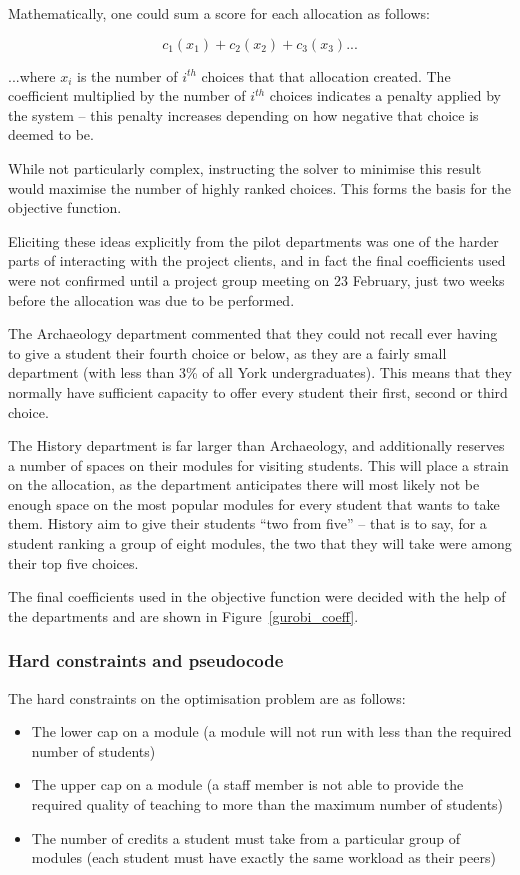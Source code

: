 Mathematically, one could sum a score for each allocation as follows:

$$
c_1(x_1) + c_2(x_2) + c_3(x_3) ...
$$

...where $x_i$ is the number of $i^{th}$ choices that that allocation created.
The coefficient multiplied by the number of $i^{th}$ choices indicates a
penalty applied by the system -- this penalty increases depending on how
negative that choice is deemed to be.

While not particularly complex, instructing the solver to minimise this result
would maximise the number of highly ranked choices. This forms the basis for
the objective function.

Eliciting these ideas explicitly from the pilot departments was one of the
harder parts of interacting with the project clients, and in fact the final
coefficients used were not confirmed until a project group meeting on 23
February, just two weeks before the allocation was due to be performed.

The Archaeology department commented that they could not recall ever having to
give a student their fourth choice or below, as they are a fairly small
department (with less than 3\% of all York %
undergraduates). This means that they normally have sufficient capacity to
offer every student their first, second or third choice.

The History department is far larger than Archaeology, and additionally
reserves a number of spaces on their modules for visiting students. This will
place a strain on the allocation, as the department anticipates there will
most likely not be enough space on the most popular modules for every student
that wants to take them. History aim to give their students ``two from five''
-- that is to say, for a student ranking a group of eight modules, the two
that they will take were among their top five choices.

The final coefficients used in the objective function were decided with the
help of the departments and are shown in Figure~\ref{gurobi_coeff}.

\subsubsection{Hard constraints and pseudocode}

The hard constraints on the optimisation problem are as follows:

\begin{itemize}
  \item The lower cap on a module (a module will not run with less than the
        required number of students)
  \item The upper cap on a module (a staff member is not able to provide the
        required quality of teaching to more than the maximum number of students)
  \item The number of credits a student must take from a particular group of
        modules (each student must have exactly the same workload as their
        peers)
\end{itemize}

